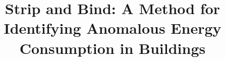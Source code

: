 \documentclass{sig-alternate-ipsn13}
\title{Strip and Bind: A Method for Identifying Anomalous Energy Consumption in Buildings}
\begin{document}
\maketitle



















\small


\end{document}
